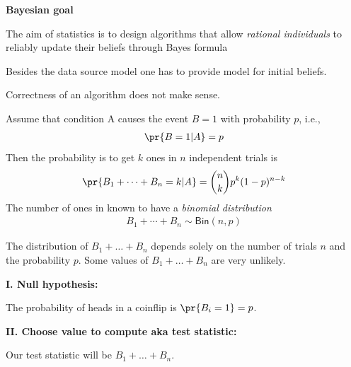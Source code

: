 \documentclass[landscape,footrule]{foils}
\begin{document}
\textbf{Bayesian goal}
\begin{triangles}
\item The aim of statistics is to design algorithms that allow \emph{rational individuals} to reliably update their beliefs through Bayes formula
\item Besides the data source model one has to provide model for initial beliefs.
\item Correctness of an algorithm does not make sense.
\end{triangles}



Assume that condition A causes the event $B=1$ with probability $p$, i.e.,
\begin{align*}
\pr{B=1|A}=p
\end{align*}
Then the probability is to get $k$ ones in $n$ independent trials is
\begin{align*}
\pr{B_1+\cdots+B_n=k|A}=\binom{n}{k}p^k(1-p)^{n-k}
\end{align*} 
The number of ones in known to have a \emph{binomial distribution}
\begin{align*}
 B_1+\cdots+B_n\sim\mathsf{Bin}(n, p)
\end{align*}


\vspace*{-1cm}

The distribution of  $B_1+\ldots+B_n$ depends solely on the number of trials $n$ and the probability $p$. Some values of $B_1+\ldots+B_n$ are very unlikely.


\textbf{I. Null hypothesis:}
\begin{triangles}
\item The probability of heads in a coinflip is $\pr{B_i=1}=p$.
\end{triangles}
\vspace*{1cm}

\textbf{II. Choose value to compute aka test statistic:} 
\begin{triangles}
\item Our test statistic will be $B_1+\ldots+B_n$.
\end{triangles}
\vspace*{1cm}
\end{document}
